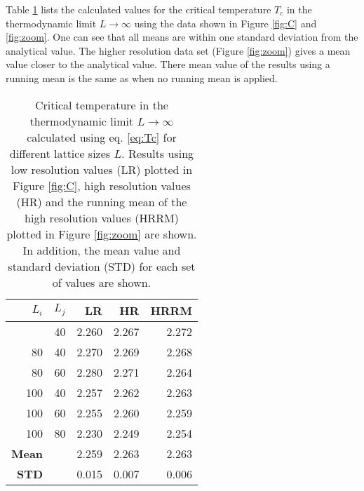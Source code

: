 Table \ref{tab:Tc} lists the calculated values for the critical temperature $T_c$ in the thermodynamic limit $L \rightarrow \infty$  using the data shown in Figure \ref{fig:C} and \ref{fig:zoom}. One can see that all means are within one standard deviation from the analytical value. The higher resolution data set (Figure \ref{fig:zoom}) gives a mean value closer to the analytical value. There mean value of the results using a running mean is the same as when no running mean is applied. 
\begin{table}[]
	\centering
	\begin{tabular}{rrrrr}
		$L_i$         & $L_j$ & LR  & HR & HRRM \\
		\hline
		\addlinespace[0.1cm]
		60            & 40    & 2.260 & 2.267 & 2.272     \\
		80            & 40    & 2.270 & 2.269 & 2.268     \\
		80            & 60    & 2.280 & 2.271 & 2.264     \\
		100           & 40    & 2.257 & 2.262 & 2.263     \\
		100           & 60    & 2.255 & 2.260 & 2.259     \\
		100           & 80    & 2.230 & 2.249 & 2.254     \\
		\hline
		\addlinespace[0.1cm]
		\textbf{Mean} &       & 2.259 & 2.263 & 2.263     \\
		\textbf{STD}  &       & 0.015 & 0.007 & 0.006    
	\end{tabular}
	\caption{Critical temperature in the thermodynamic limit $L \rightarrow \infty$ calculated using eq. \ref{eq:Tc} for different lattice sizes $L$. Results using low resolution values (LR) plotted in Figure \ref{fig:C}, high resolution values (HR) and the running mean of the high resolution values (HRRM) plotted in Figure \ref{fig:zoom} are shown. In addition, the mean value and standard deviation (STD) for each set of values are shown.}
	\label{tab:Tc}
\end{table}
